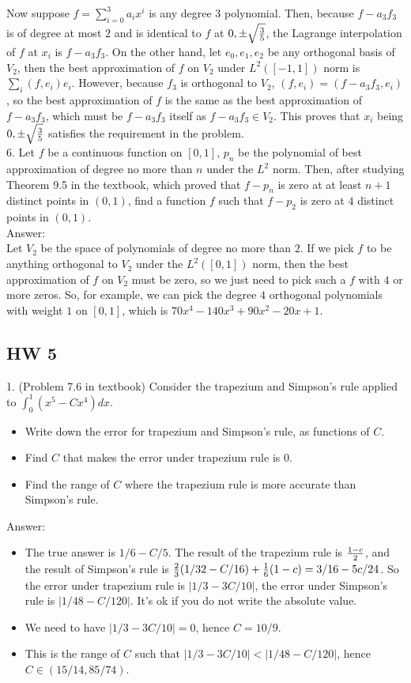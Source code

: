 \documentclass[20pt]{article} %
\theoremstyle{break}
\begin{document}
Now suppose $f=\sum_{i=0}^3a_ix^i$ is any degree $3$ polynomial. Then, because $f-a_3f_3$ is of degree at most $2$ and is identical to $f$ at $0, \pm\sqrt{3\over 5}$, the Lagrange interpolation of $f$ at $x_i$ is $f-a_3f_3$. On the other hand, let $e_0, e_1, e_2$ be any orthogonal basis of $V_2$, then the best approximation of $f$ on $V_2$ under $L^2([-1, 1])$ norm is $\sum_i(f, e_i)e_i$. However, because $f_3$ is orthogonal to $V_2$, $(f, e_i)=(f-a_3f_3, e_i)$, so the best approximation of $f$ is the same as the best approximation of $f-a_3f_3$, which must be $f-a_3f_3$ itself as $f-a_3f_3\in V_2$. This proves that $x_i$ being $0, \pm\sqrt{3\over 5}$ satisfies the requirement in the problem.\\


6. Let $f$ be a continuous function on $[0, 1]$, $p_n$ be the polynomial of best approximation of degree no more than $n$ under the $L^2$ norm. Then, after studying Theorem 9.5 in the textbook, which proved that $f-p_n$ is zero at at least $n+1$ distinct points in $(0, 1)$, find a function $f$ such that $f-p_2$ is zero at $4$ distinct points in $(0, 1)$.\\

Answer:\\

Let $V_2$ be the space of polynomials of degree no more than $2$. If we pick $f$ to be anything orthogonal to $V_2$ under the $L^2([0, 1])$ norm, then the best approximation of $f$ on $V_2$ must be zero, so we just need to pick such a $f$ with $4$ or more zeros. So, for example, we can pick the degree $4$ orthogonal polynomials with weight $1$ on $[0, 1]$, which is $70x^4-140x^3+90x^2-20x+1$.

\subsection{HW 5}

1. (Problem 7.6 in textbook) Consider the trapezium and Simpson's rule applied to $\int_0^1(x^5-Cx^4)dx$.
\begin{itemize}
\item Write down the error for trapezium and Simpson's rule, as functions of $C$.
\item Find $C$ that makes the error under trapezium rule is $0$.
\item Find the range of $C$ where the trapezium rule is more accurate than Simpson's rule.
\end{itemize}

Answer:
\begin{itemize}
\item The true answer is $1/6-C/5$. The result of the trapezium rule is ${1-c\over 2}$, and the result of Simpson's rule is ${2\over 3}(1/32-C/16)+{1\over 6}(1-c)=3/16-{5c/24}$. So the error under trapezium rule is $|1/3-3C/10|$, the error under Simpson's rule is $|1/48-C/120|$. It's ok if you do not write the absolute value.
\item We need to have $|1/3-3C/10|=0$, hence $C=10/9$.
\item This is the range of $C$ such that $|1/3-3C/10|<|1/48-C/120|$, hence $C\in (15/14, 85/74)$.
\end{itemize}
\end{document}
